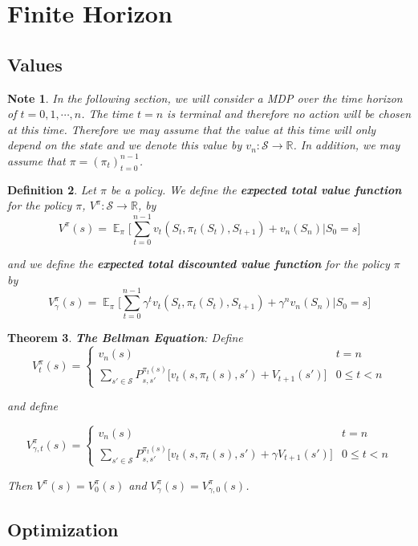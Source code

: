 \documentclass[12pt]{amsart}
\newtheorem{thm}{Theorem}[section]
\newtheorem{defn}[thm]{Definition}
\newtheorem{note}[thm]{Note}
\newcommand{\gam}{\gamma}
\newcommand{\R}{\mathbb{R}}
\newcommand{\MS}{\mathcal{S}}
\DeclareMathOperator*{\E}{\mathbb{E}}
\begin{document}
\section{Finite Horizon}

\subsection{Values}
\begin{note}
In the following section, we will consider a MDP over the time horizon of $t=0,1, \cdots, n$. The time $t = n$ is terminal and therefore no action will be chosen at this time. Therefore we may assume that the value at this time will only depend on the state and we denote this value by $v_n:\MS \rightarrow \R$. In addition, we may assume that $\pi = (\pi_t)_{t=0}^{n-1}$.
\end{note}
\begin{defn} 
Let $\pi$ be a policy. We define the \textbf{expected total value function} for the policy $\pi$, $V^{\pi}: \MS \rightarrow \R$, by $$V^{\pi}(s) = \E_{\pi}\bigg[\sum_{t =0}^{n-1} v_t(S_t, \pi_t(S_t), S_{t+1})+ v_n(S_n)|S_0=s\bigg]$$

and we define the \textbf{expected total discounted value function} for the policy $\pi$ by $$V^{\pi}_\gam (s) = \E_{\pi}\bigg[\sum_{t =0}^{n-1} \gam^t v_t(S_t, \pi_t(S_t), S_{t+1}) + \gam^n v_n(S_n)|S_0=s\bigg]$$
\end{defn}

\begin{thm}{\textbf{The Bellman Equation}:}
Define 
\[ V_t^{\pi}(s) = 
\begin{cases}
v_n(s) & t = n \\
\sum\limits_{s' \in \MS} P^{\pi_t(s)}_{s, s'}\bigg[v_t(s, \pi_t(s), s') + V_{t+1}(s')\bigg] & 0 \leq t < n
\end{cases}
\]

and define 

\[ V_{\gam, t}^{\pi}(s) = 
\begin{cases}
v_n(s) & t = n \\
\sum\limits_{s' \in \MS} P^{\pi_t(s)}_{s, s'}\bigg[v_t(s, \pi_t(s), s') + \gam V_{t+1}(s')\bigg] & 0 \leq t < n
\end{cases}
\]

Then $V^{\pi}(s) = V_0^{\pi}(s)$ and $V_\gam ^{\pi}(s) = V_{\gam, 0}^{\pi}(s)$.
\end{thm}

\subsection{Optimization}
\end{document}
